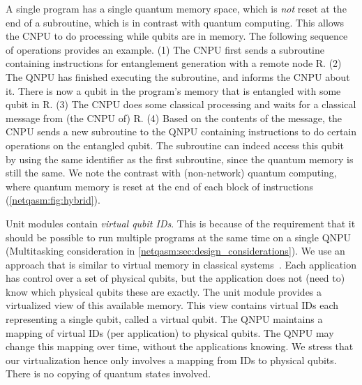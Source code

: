 A single program has a single quantum memory space, which is \textit{not} reset at the end of a subroutine, which is in contrast with quantum computing.
This allows the \ac{CNPU} to do processing while qubits are in memory.
The following sequence of operations provides an example.
    (1) The \ac{CNPU} first sends a subroutine containing instructions for entanglement generation with a remote node R.
    (2) The \ac{QNPU} has finished executing the subroutine, and informs the \ac{CNPU} about it.
        There is now a qubit in the program's memory that is entangled with some qubit in R.
    (3) The \ac{CNPU} does some classical processing and waits for a classical message from (the \ac{CNPU} of) R.
    (4) Based on the contents of the message, the \ac{CNPU} sends a new subroutine to the \ac{QNPU} containing instructions to do certain operations on the entangled qubit.
        The subroutine can indeed access this qubit by using the same identifier as the first subroutine, since the quantum memory is still the same.
        We note the contrast with (non-network) quantum computing, where quantum memory is reset at the end of each block of instructions (\cref{netqasm:fig:hybrid}).


Unit modules contain \textit{virtual qubit IDs}.
This is because of the requirement that it should be possible to run multiple programs at the same time on a single \ac{QNPU} (Multitasking consideration in \cref{netqasm:sec:design_considerations}).
We use an approach that is similar to virtual memory in classical systems~\cite{arpaci2018operating}.
Each application has control over a set of physical qubits, but the application does not (need to) know which physical qubits these are exactly.
The unit module provides a virtualized view of this available memory.
This view contains virtual IDs each representing a single qubit, called a virtual qubit.
The \ac{QNPU} maintains a mapping of virtual IDs (per application) to physical qubits.
The \ac{QNPU} may change this mapping over time, without the applications knowing.
We stress that our virtualization hence only involves a mapping from IDs to physical qubits.
There is no copying of quantum states involved.

